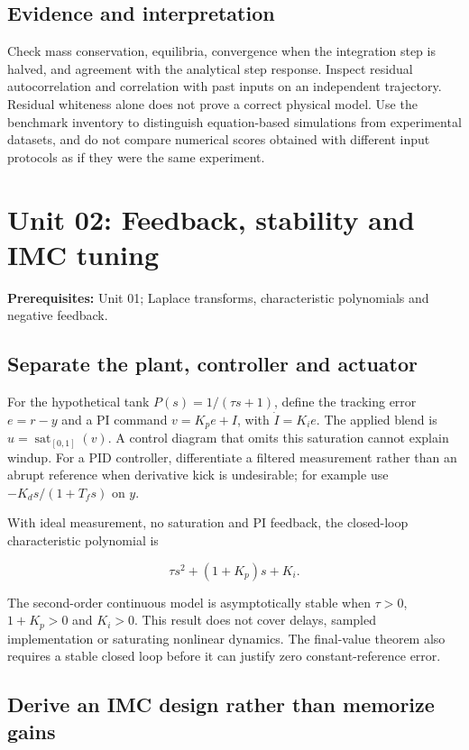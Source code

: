 \documentclass[11pt,a4paper]{article}
\begin{document}
\subsection{Evidence and interpretation}

Check mass conservation, equilibria, convergence when the integration step is halved, and agreement with the analytical step response. Inspect residual autocorrelation and correlation with past inputs on an independent trajectory. Residual whiteness alone does not prove a correct physical model. Use the benchmark inventory to distinguish equation-based simulations from experimental datasets, and do not compare numerical scores obtained with different input protocols as if they were the same experiment.

\clearpage\section{Unit 02: Feedback, stability and IMC tuning}
\textbf{Prerequisites:} Unit 01; Laplace transforms, characteristic polynomials and negative feedback.

\subsection{Separate the plant, controller and actuator}

For the hypothetical tank $P(s)=1/(\tau s+1)$, define the tracking error $e=r-y$ and a PI command $v=K_pe+I$, with $\dot I=K_ie$. The applied blend is $u=\operatorname{sat}_{[0,1]}(v)$. A control diagram that omits this saturation cannot explain windup. For a PID controller, differentiate a filtered measurement rather than an abrupt reference when derivative kick is undesirable; for example use $-K_ds/(1+T_fs)$ on $y$.


With ideal measurement, no saturation and PI feedback, the closed-loop characteristic polynomial is


\[\tau s^2+(1+K_p)s+K_i.\]

The second-order continuous model is asymptotically stable when $\tau>0$, $1+K_p>0$ and $K_i>0$. This result does not cover delays, sampled implementation or saturating nonlinear dynamics. The final-value theorem also requires a stable closed loop before it can justify zero constant-reference error.


\subsection{Derive an IMC design rather than memorize gains}
\end{document}
